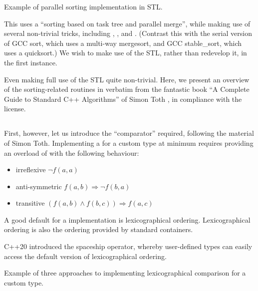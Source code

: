 \begin{codebox}[breakable]{}
\footnotesize Example of parallel sorting implementation in STL.
\tcblower
{}
\end{codebox}

This uses a ``sorting based on task tree and parallel merge'', while making use of several non-trivial tricks, including , , and . (Contrast this with the serial version of GCC sort, which uses a multi-way mergesort, and GCC stable\_sort, which uses a quicksort.) We wish to make use of the STL, rather than redevelop it, in the first instance. 


Even making full use of the STL quite non-trivial. Here, we present an overview of the sorting-related routines in verbatim from the fantastic book ``A Complete Guide to Standard C++ Algorithms'' of Simon Toth \cite{toth2023}, in compliance with the license. 

\subsection{}

First, however, let us introduce the  ``comparator'' required, following the material of Simon Toth.
Implementing a  for a custom type at minimum requires providing an overload of  with the following behaviour:

\begin{itemize}
    \item irreflexive $\neg f(a,a)$
    \item anti-symmetric $f(a,b) \Rightarrow \neg f(b,a)$
    \item transitive $(f(a,b) \wedge f(b,c)) \Rightarrow f(a,c)$
\end{itemize}

A good default for a  implementation is lexicographical ordering. Lexicographical ordering is also the ordering provided by standard containers.

C++20 introduced the spaceship operator, whereby user-defined types can easily access the default version of lexicographical ordering.

\begin{codebox}[breakable]{\href{https://compiler-explorer.com/z/7PjY8fc1G}{\ExternalLink}}
\footnotesize Example of three approaches to implementing lexicographical comparison for a custom type.
\tcblower
{}
\end{codebox}

